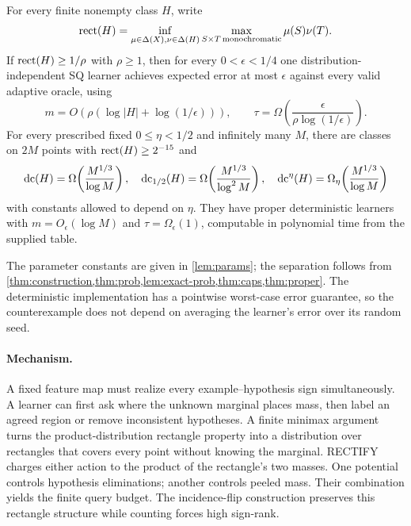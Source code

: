 \begin{maintheorem}
For every finite nonempty class $H$, write
\[
\operatorname{rect}(H)=\inf_{\mu\in\Delta(X),\nu\in\Delta(H)}
 \max_{S\times T\,\mathrm{monochromatic}}\mu(S)\nu(T).
\]
If $\operatorname{rect}(H)\ge1/\rho$ with $\rho\ge1$, then for every $0<\epsilon<1/4$ one distribution-independent SQ learner achieves expected error at most $\epsilon$ against every valid adaptive oracle, using
\[
 m=O\!\left(\rho(\log|H|+\log(1/\epsilon))\right),\qquad
 \tau=\Omega\!\left(\frac{\epsilon}{\rho\log(1/\epsilon)}\right).
\]
For every prescribed fixed $0\le\eta<1/2$ and infinitely many $M$, there are classes on $2M$ points with $\operatorname{rect}(H)\ge2^{-15}$ and
\[
 \operatorname{dc}(H)=\Omega\!\left(\frac{M^{1/3}}{\log M}\right),\quad
 \operatorname{dc}_{1/2}(H)=\Omega\!\left(\frac{M^{1/3}}{\log^2 M}\right),\quad
 \operatorname{dc}^\eta(H)=\Omega_\eta\!\left(\frac{M^{1/3}}{\log M}\right)
\]
with constants allowed to depend on $\eta$. They have proper deterministic learners with $m=O_\epsilon(\log M)$ and $\tau=\Omega_\epsilon(1)$, computable in polynomial time from the supplied table.
\end{maintheorem}
The parameter constants are given in \cref{lem:params}; the separation follows from \cref{thm:construction,thm:prob,lem:exact-prob,thm:caps,thm:proper}. The deterministic implementation has a pointwise worst-case error guarantee, so the counterexample does not depend on averaging the learner's error over its random seed.

\paragraph{Mechanism.}
A fixed feature map must realize every example--hypothesis sign simultaneously. A learner can first ask where the unknown marginal places mass, then label an agreed region or remove inconsistent hypotheses. A finite minimax argument turns the product-distribution rectangle property into a distribution over rectangles that covers every point without knowing the marginal. RECTIFY charges either action to the product of the rectangle's two masses. One potential controls hypothesis eliminations; another controls peeled mass. Their combination yields the finite query budget. The incidence-flip construction preserves this rectangle structure while counting forces high sign-rank.

